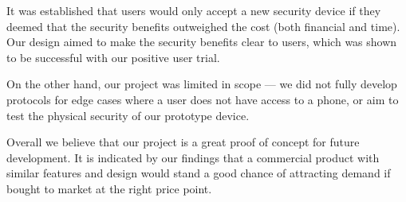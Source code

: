 \documentclass[conference]{IEEEtran}
\begin{document}
It was established that users would only accept a new security device if they deemed that the security benefits outweighed the cost (both financial and time).
Our design aimed to make the security benefits clear to users, which was shown to be successful with our positive user trial.

On the other hand, our project was limited in scope --- we did not fully develop protocols for edge cases where a user  does not have access to a phone, or aim to test the physical security of our prototype device.

Overall we believe that our project is a great proof of concept for future development.
It is indicated by our findings that a commercial product with similar features and design would stand a good chance of attracting demand if bought to market at the right price point. 





\end{document}
